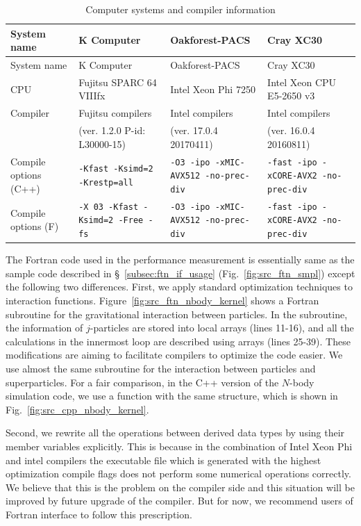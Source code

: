 \documentclass[proof,useamsfonts]{pasj01}
\begin{document}
\begin{longtable}{l|p{4cm}p{4cm}p{4cm}}
\caption{Computer systems and compiler information}
\label{tbl:computer_systems}
\hline
System name & K Computer & Oakforest-PACS & Cray XC30   \\
\hline\hline
\endfirsthead
System name & K Computer & Oakforest-PACS & Cray XC30   \\
\hline\hline
\endhead
\hline
\endfoot
\hline
\endlastfoot
CPU & Fujitsu SPARC 64 VIIIfx & Intel Xeon Phi 7250 & Intel Xeon CPU E5-2650 v3  \\
Compiler & Fujitsu compilers  & Intel compilers  & Intel compilers  \\
& (ver. 1.2.0 P-id: L30000-15) & (ver. 17.0.4 20170411) & (ver. 16.0.4 20160811) \\
Compile options (C++) & \texttt{-Kfast -Ksimd=2 -Krestp=all} & \texttt{-O3 -ipo -xMIC-AVX512 -no-prec-div} & \texttt{-fast -ipo -xCORE-AVX2 -no-prec-div} \\
Compile options (F) & \texttt{-X 03 -Kfast -Ksimd=2 -Free -fs} & \texttt{-O3 -ipo -xMIC-AVX512 -no-prec-div} & \texttt{-fast -ipo -xCORE-AVX2 -no-prec-div} \\
\end{longtable}


The Fortran code used in the performance measurement is essentially same as the sample code described in \S~\ref{subsec:ftn_if_usage} (Fig.~\ref{fig:src_ftn_smpl}) except the following two differences. First, we apply standard optimization techniques to interaction functions. Figure~\ref{fig:src_ftn_nbody_kernel} shows a Fortran subroutine for the gravitational interaction between particles. In the subroutine, the information of $j$-particles are stored into local arrays (lines 11-16), and all the calculations in the innermost loop are described using arrays (lines 25-39). These modifications are aiming to facilitate compilers to optimize the code easier. We use almost the same subroutine for the interaction between particles and superparticles. For a fair comparison, in the C++ version of the $N$-body simulation code, we use a function with the same structure, which is shown in Fig.~\ref{fig:src_cpp_nbody_kernel}.

Second, we rewrite all the operations between derived data types by using their member variables explicitly. This is because in the combination of Intel Xeon Phi and intel compilers the executable file which is generated with the highest optimization compile flags does not perform some numerical operations correctly. We believe that this is the problem on the compiler side and this situation will be improved by future upgrade of the compiler. But for now, we recommend users of Fortran interface to follow this prescription.
\end{document}
